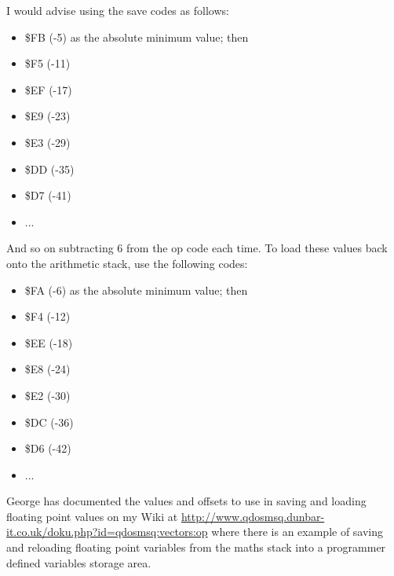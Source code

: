I would advise using the save codes as follows:
\begin{itemize}[itemsep=0pt]

\item{}\$FB (-{}5) as the absolute minimum value; then


\item{}\$F5 (-{}11)


\item{}\$EF (-{}17)


\item{}\$E9 (-{}23)


\item{}\$E3 (-{}29)


\item{}\$DD (-{}35)


\item{}\$D7 (-{}41)


\item{}...

\end{itemize}

And so on subtracting 6 from the op code each time. To load these
    values back onto the arithmetic stack, use the following codes:
\begin{itemize}[itemsep=0pt]

\item{}\$FA (-{}6) as the absolute minimum value; then


\item{}\$F4 (-{}12)


\item{}\$EE (-{}18)


\item{}\$E8 (-{}24)


\item{}\$E2 (-{}30)


\item{}\$DC (-{}36)


\item{}\$D6 (-{}42)


\item{}...

\end{itemize}

George has documented the values and offsets to use in saving and loading floating point values on my Wiki at \url{http://www.qdosmsq.dunbar-it.co.uk/doku.php?id=qdosmsq:vectors:op} where there is an example of saving and reloading floating point variables from the maths stack into a programmer defined variables storage area.

